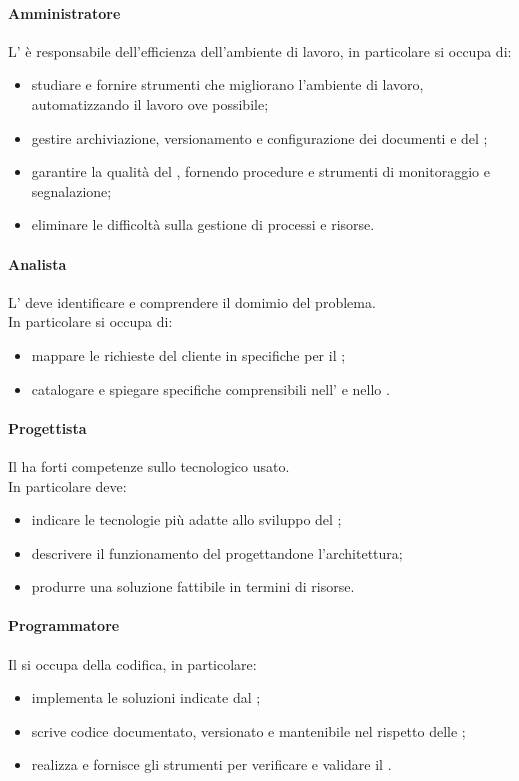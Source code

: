  \paragraph{Amministratore}
 L'\AMM{} è responsabile dell'efficienza dell'ambiente di lavoro, in particolare si occupa di:
 \begin{itemize}
  \item studiare e fornire strumenti che migliorano l'ambiente di lavoro, automatizzando il lavoro ove possibile;
  \item gestire archiviazione, versionamento e configurazione dei documenti e del ;
  \item garantire la qualità del , fornendo procedure e strumenti di monitoraggio e segnalazione;
  \item eliminare le difficoltà sulla gestione di processi e risorse.
 \end{itemize}
 \paragraph{Analista}
 L'\AN{} deve identificare e comprendere il domimio del problema. \\
 In particolare si occupa di:
 \begin{itemize}
  \item mappare le richieste del cliente in specifiche per il ;
  \item catalogare e spiegare specifiche comprensibili nell'\ARdoc{} e nello \SFdoc{}.
 \end{itemize}
 \paragraph{Progettista}
 Il \PJ{} ha forti competenze sullo  tecnologico usato. \\
 In particolare deve: 
 \begin{itemize}
  \item indicare le tecnologie più adatte allo sviluppo del ;
  \item descrivere il funzionamento del  progettandone l'architettura;
  \item produrre una soluzione fattibile in termini di risorse.
 \end{itemize}
 \paragraph{Programmatore}
 Il \PR{} si occupa della codifica, in particolare:
 \begin{itemize}
  \item implementa le soluzioni indicate dal \PJ ;
  \item scrive codice documentato, versionato e mantenibile nel rispetto delle \NPdoc ;
  \item realizza e fornisce gli strumenti per verificare e validare il .
 \end{itemize}

